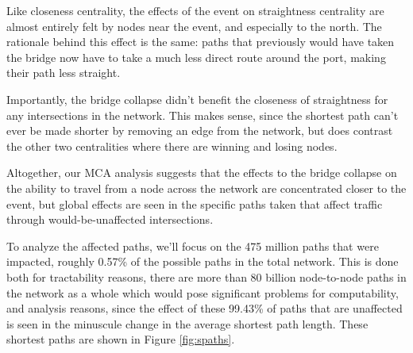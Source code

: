 \documentclass[11pt]{article}
\numberwithin{equation}{section} %
\numberwithin{figure}{section} %
\numberwithin{table}{section} %
\theoremstyle{definition}
\begin{document}
Like closeness centrality, the effects of the event on straightness centrality are almost entirely felt by nodes near the event, and especially to the north. The rationale behind this effect is the same: paths that previously would have taken the bridge now have to take a much less direct route around the port, making their path less straight.

Importantly, the bridge collapse didn't benefit the closeness of straightness for any intersections in the network. This makes sense, since the shortest path can't ever be made shorter by removing an edge from the network, but does contrast the other two centralities where there are winning and losing nodes.

Altogether, our MCA analysis suggests that the effects to the bridge collapse on the ability to travel from a node across the network are concentrated closer to the event, but global effects are seen in the specific paths taken that affect traffic through would-be-unaffected intersections.

To analyze the affected paths, we'll focus on the 475 million paths that were impacted, roughly 0.57\% of the possible paths in the total network. This is done both for tractability reasons, there are more than 80 billion node-to-node paths in the network as a whole which would pose significant problems for computability, and analysis reasons, since the effect of these 99.43\% of paths that are unaffected is seen in the minuscule change in the average shortest path length. These shortest paths are shown in Figure \ref{fig:spaths}.
\end{document}
